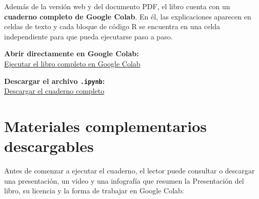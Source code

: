 \documentclass[
  spanish,
  10.5pt,
  letterpaper,
  openany,
  headings=big]{scrbook}
\begin{document}
Además de la versión web y del documento PDF, el libro cuenta con un
\textbf{cuaderno completo de Google Colab}. En él, las explicaciones
aparecen en celdas de texto y cada bloque de código R se encuentra en
una celda independiente para que pueda ejecutarse paso a paso.

\begin{tcolorbox}[enhanced jigsaw, arc=.35mm, bottomrule=.15mm, bottomtitle=1mm, breakable, colback=white, colbacktitle=quarto-callout-tip-color!10!white, colframe=quarto-callout-tip-color-frame, coltitle=black, left=2mm, leftrule=.75mm, opacityback=0, opacitybacktitle=0.6, rightrule=.15mm, title=\textcolor{quarto-callout-tip-color}{\faLightbulb}\hspace{0.5em}{Abrir o descargar el cuaderno}, titlerule=0mm, toprule=.15mm, toptitle=1mm]

\textbf{Abrir directamente en Google Colab:}\\
\href{https://colab.research.google.com/github/gilbertorodriguez59/libro-machine-learning-r-dev/blob/main/Aprendizaje_y_Clasificacion_Automatica_con_R_Colab.ipynb}{Ejecutar
el libro completo en Google Colab}

\textbf{Descargar el archivo \texttt{.ipynb}:}\\
\href{Aprendizaje_y_Clasificacion_Automatica_con_R_Colab.ipynb}{Descargar
el cuaderno completo}

\end{tcolorbox}

\section*{Materiales complementarios
descargables}\label{materiales-complementarios-descargables-2}


Antes de comenzar a ejecutar el cuaderno, el lector puede consultar o
descargar una presentación, un video y una infografía que resumen la
Presentación del libro, su licencia y la forma de trabajar en Google
Colab:
\end{document}
